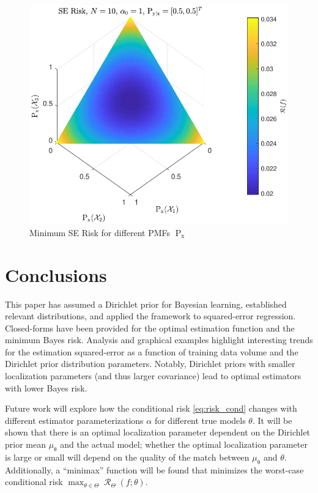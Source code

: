 \documentclass{article}
\DeclareMathOperator{\xrm}{\mathrm{x}}
\DeclareMathOperator{\Prm}{\mathrm{P}}
\DeclareMathOperator{\Rcal}{\mathcal{R}}
\begin{document}
\begin{figure}
\centering
\includegraphics[width=1.0\linewidth]{Risk_SE_Dir_IO_Px_N_10_a0_1.pdf}
\caption{Minimum SE Risk for different PMFs $\Prm_{\xrm}$}
\label{fig:Risk_SE_Dir_IO_Px_N_10_a0_1}
\end{figure}





\section{Conclusions}

This paper has assumed a Dirichlet prior for Bayesian learning, established relevant distributions, and applied the framework to squared-error regression. Closed-forms have been provided for the optimal estimation function and the minimum Bayes risk. Analysis and graphical examples highlight interesting trends for the estimation squared-error as a function of training data volume and the Dirichlet prior distribution parameters. Notably, Dirichlet priors with smaller localization parameters (and thus larger covariance) lead to optimal estimators with lower Bayes risk. 

Future work will explore how the conditional risk \eqref{eq:risk_cond} changes with different estimator parameterizations $\alpha$ for different true models $\theta$. It will be shown that there is an optimal localization parameter dependent on the Dirichlet prior mean $\mu_{\uptheta}$ and the actual model; whether the optimal localization parameter is large or small will depend on the quality of the match between $\mu_{\uptheta}$ and $\theta$. Additionally, a ``minimax'' function will be found that minimizes the worst-case conditional risk $\max_{\theta \in \Theta}\Rcal_{\Theta}(f ; \theta)$.
\end{document}

